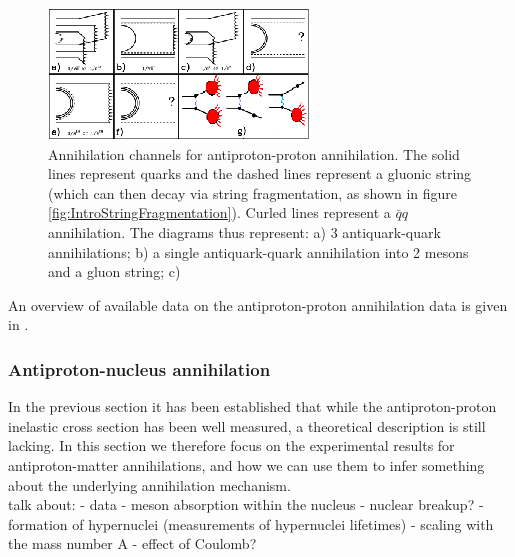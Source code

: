 \begin{figure}
    \centering
    \includegraphics[width=\textwidth]{figures/antiproton_p_annihilations.png}
    \caption{Annihilation channels for antiproton-proton annihilation. The solid lines represent quarks and the dashed lines represent a gluonic string (which can then decay via string fragmentation, as shown in figure \ref{fig:IntroStringFragmentation}). Curled lines represent a $\bar{q}q$ annihilation. The diagrams thus represent: a) 3 antiquark-quark annihilations; b) a single antiquark-quark annihilation into 2 mesons and a gluon string; c)}
    \label{fig:my_label}
\end{figure}
An overview of available data on the antiproton-proton annihilation data is given in \cite{hidden_Strangeness, antiproton_physics_data}.



\subsubsection{Antiproton-nucleus annihilation}
In the previous section it has been established that while the antiproton-proton inelastic cross section has been well measured, a theoretical description is still lacking. In this section we therefore focus on the experimental results for antiproton-matter annihilations, and how we can use them to infer something about the underlying annihilation mechanism. \\



talk about:
- data
- meson absorption within the nucleus
- nuclear breakup?
- formation of hypernuclei (measurements of hypernuclei lifetimes)
- scaling with the mass number A
- effect of Coulomb?
